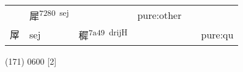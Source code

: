 \documentclass[14pt,a4paper]{scrartcl}
\begin{document}
\begin{longtable}[c]{@{}llllll@{}}
\begin{minipage}[t]{0.14\columnwidth}\raggedright\strut
\strut\end{minipage} &
\begin{minipage}[t]{0.14\columnwidth}\raggedright\strut
犀\textsuperscript{7280~sej}
\strut\end{minipage} &
\begin{minipage}[t]{0.14\columnwidth}\raggedright\strut
\strut\end{minipage} &
\begin{minipage}[t]{0.14\columnwidth}\raggedright\strut
pure:other
\strut\end{minipage}\tabularnewline
\begin{minipage}[t]{0.14\columnwidth}\raggedright\strut
屖
\strut\end{minipage} &
\begin{minipage}[t]{0.14\columnwidth}\raggedright\strut
sej
\strut\end{minipage} &
\begin{minipage}[t]{0.14\columnwidth}\raggedright\strut
穉\textsuperscript{7a49~drijH}
\strut\end{minipage} &
\begin{minipage}[t]{0.14\columnwidth}\raggedright\strut
\strut\end{minipage} &
\begin{minipage}[t]{0.14\columnwidth}\raggedright\strut
\strut\end{minipage} &
\begin{minipage}[t]{0.14\columnwidth}\raggedright\strut
pure:qu
\strut\end{minipage}\tabularnewline
\bottomrule
\end{longtable}

(171) 0600 {[}2{]}
\end{document}
